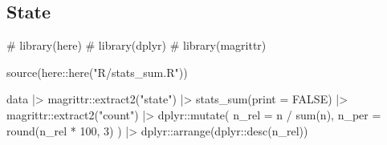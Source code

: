 \documentclass[
  12pt,
  a4paper,
  oneside]{tesesusp}
\newenvironment{Shaded}{\begin{snugshade}}{\end{snugshade}}
\newcommand{\AttributeTok}[1]{\textcolor[rgb]{0.40,0.45,0.13}{#1}}
\newcommand{\CommentTok}[1]{\textcolor[rgb]{0.37,0.37,0.37}{#1}}
\newcommand{\ConstantTok}[1]{\textcolor[rgb]{0.56,0.35,0.01}{#1}}
\newcommand{\DecValTok}[1]{\textcolor[rgb]{0.68,0.00,0.00}{#1}}
\newcommand{\FunctionTok}[1]{\textcolor[rgb]{0.28,0.35,0.67}{#1}}
\newcommand{\NormalTok}[1]{\textcolor[rgb]{0.00,0.23,0.31}{#1}}
\newcommand{\SpecialCharTok}[1]{\textcolor[rgb]{0.37,0.37,0.37}{#1}}
\newcommand{\StringTok}[1]{\textcolor[rgb]{0.13,0.47,0.30}{#1}}
\begin{document}
\hypertarget{state}{%
\subsection{State}\label{state}}

\begin{Shaded}
\begin{Highlighting}[numbers=left,,]
\CommentTok{\# library(here)}
\CommentTok{\# library(dplyr)}
\CommentTok{\# library(magrittr)}

\FunctionTok{source}\NormalTok{(here}\SpecialCharTok{::}\FunctionTok{here}\NormalTok{(}\StringTok{"R/stats\_sum.R"}\NormalTok{))}

\NormalTok{data }\SpecialCharTok{|\textgreater{}} 
\NormalTok{  magrittr}\SpecialCharTok{::}\FunctionTok{extract2}\NormalTok{(}\StringTok{"state"}\NormalTok{) }\SpecialCharTok{|\textgreater{}}
  \FunctionTok{stats\_sum}\NormalTok{(}\AttributeTok{print =} \ConstantTok{FALSE}\NormalTok{) }\SpecialCharTok{|\textgreater{}}
\NormalTok{  magrittr}\SpecialCharTok{::}\FunctionTok{extract2}\NormalTok{(}\StringTok{"count"}\NormalTok{) }\SpecialCharTok{|\textgreater{}}
\NormalTok{  dplyr}\SpecialCharTok{::}\FunctionTok{mutate}\NormalTok{(}
    \AttributeTok{n\_rel =}\NormalTok{ n }\SpecialCharTok{/} \FunctionTok{sum}\NormalTok{(n),}
    \AttributeTok{n\_per =} \FunctionTok{round}\NormalTok{(n\_rel }\SpecialCharTok{*} \DecValTok{100}\NormalTok{, }\DecValTok{3}\NormalTok{)}
\NormalTok{    ) }\SpecialCharTok{|\textgreater{}}
\NormalTok{  dplyr}\SpecialCharTok{::}\FunctionTok{arrange}\NormalTok{(dplyr}\SpecialCharTok{::}\FunctionTok{desc}\NormalTok{(n\_rel))}
\end{Highlighting}
\end{Shaded}
\end{document}
